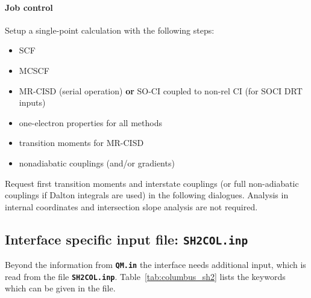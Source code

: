 \documentclass[a4paper,11pt,DIV=15,openany,twoside=false]{scrbook}
\newcommand{\ttt}[1]{\textbf{\texttt{#1}}}
\begin{document}
\paragraph{Job control}

Setup a single-point calculation with the following steps:
\begin{itemize}
  \item SCF
  \item MCSCF
  \item MR-CISD (serial operation) \textbf{or} SO-CI coupled to non-rel CI (for SOCI DRT inputs)
  \item one-electron properties for all methods
  \item transition moments for MR-CISD
  \item nonadiabatic couplings (and/or gradients)
\end{itemize}

Request first transition moments and interstate couplings (or full non-adiabatic couplings if Dalton integrals are used) in the following dialogues. Analysis in internal coordinates and intersection slope analysis are not required.

\subsection{Interface specific input file: \ttt{SH2COL.inp}}

Beyond the information from \ttt{QM.in} the interface needs additional input, which is read from the file \ttt{SH2COL.inp}. Table~\ref{tab:columbus_sh2} lists the keywords which can be given in the file.
\end{document}
